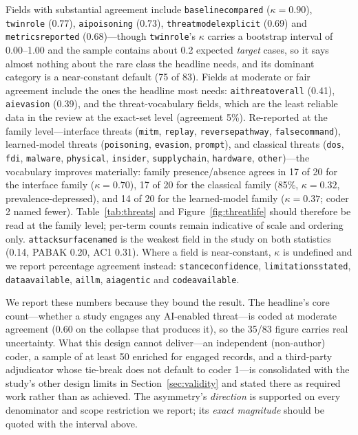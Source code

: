 \documentclass[preprint,12pt]{elsarticle}
\renewcommand{\_}{\plainunderscore\allowbreak}
\begin{document}
Fields with substantial
agreement include \texttt{baseline\_compared} ($\kappa = 0.90$), \texttt{twin\_role} (0.77),
\texttt{ai\_poisoning} (0.73), \texttt{threat\_model\_explicit} (0.69) and
\texttt{metrics\_reported} (0.68)---though \texttt{twin\_role}'s $\kappa$ carries a bootstrap
interval of 0.00--1.00 and the sample contains about 0.2 expected \emph{target} cases, so it
says almost nothing about the rare class the headline needs, and its dominant category is a
near-constant default (75 of 83). Fields at moderate or fair
agreement include the ones the
headline most needs: \texttt{ai\_threat\_overall} (0.41), \texttt{ai\_evasion} (0.39), and the
threat-vocabulary fields, which are the least reliable data in the review at the exact-set
level (agreement 5\%). Re-reported at the family level---interface threats (\texttt{mitm},
\texttt{replay}, \texttt{reverse\_pathway}, \texttt{false\_command}), learned-model threats
(\texttt{poisoning}, \texttt{evasion}, \texttt{prompt}), and classical threats
(\texttt{dos}, \texttt{fdi}, \texttt{malware}, \texttt{physical}, \texttt{insider},
\texttt{supply\_chain}, \texttt{hardware}, \texttt{other})---the vocabulary improves
materially: family presence/absence agrees in 17 of 20 for the interface family
($\kappa = 0.70$), 17 of 20 for the classical family (85\%, $\kappa = 0.32$,
prevalence-depressed), and 14 of 20 for the learned-model family ($\kappa = 0.37$; coder 2
named fewer). Table~\ref{tab:threats} and
Figure~\ref{fig:threatlife} should therefore be read at the family level; per-term counts
remain indicative of scale and ordering only. \texttt{attack\_surface\_named} is the
weakest field in the study on both statistics (0.14, PABAK 0.20, AC1 0.31). Where a field is
near-constant, $\kappa$ is undefined and we report percentage agreement instead:
\texttt{stance\_confidence}, \texttt{limitations\_stated}, \texttt{data\_available},
\texttt{ai\_llm}, \texttt{ai\_agentic} and \texttt{code\_available}.

We report these numbers because they bound the result. The headline's core count---whether a
study engages any AI-enabled threat---is coded at moderate agreement (0.60 on the collapse
that produces it), so the 35/83 figure carries real uncertainty. What this design cannot
deliver---an independent (non-author) coder, a sample of at least 50 enriched for engaged
records, and a third-party adjudicator whose tie-break does not default to coder 1---is
consolidated with the study's other design limits in Section~\ref{sec:validity} and
stated there as required work rather than as achieved. The asymmetry's \emph{direction}
is supported on every denominator and scope restriction we report; its \emph{exact
magnitude} should be quoted with the interval above.
\end{document}
